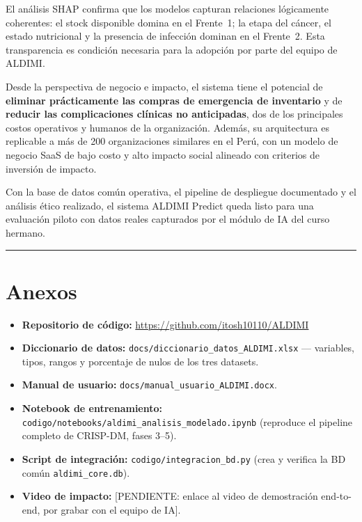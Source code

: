 \documentclass[12pt, a4paper]{article}
\begin{document}
El an\'alisis SHAP confirma que los modelos capturan relaciones l\'ogicamente coherentes: el stock disponible domina en el Frente~1; la etapa del c\'ancer, el estado nutricional y la presencia de infecci\'on dominan en el Frente~2. Esta transparencia es condici\'on necesaria para la adopci\'on por parte del equipo de ALDIMI.

Desde la perspectiva de negocio e impacto, el sistema tiene el potencial de \textbf{eliminar pr\'acticamente las compras de emergencia de inventario} y de \textbf{reducir las complicaciones cl\'inicas no anticipadas}, dos de los principales costos operativos y humanos de la organizaci\'on. Adem\'as, su arquitectura es replica\-ble a m\'as de 200 organizaciones similares en el Per\'u, con un modelo de negocio SaaS de bajo costo y alto impacto social alineado con criterios de inversi\'on de impacto.

Con la base de datos com\'un operativa, el pipeline de despliegue documentado y el an\'alisis \'etico realizado, el sistema ALDIMI Predict queda listo para una evaluaci\'on piloto con datos reales capturados por el m\'odulo de IA del curso hermano.

\vspace{1cm}
\textcolor{secundario}{\rule{\linewidth}{0.8pt}}


\section*{Anexos}

\begin{itemize}[leftmargin=1.6em, itemsep=4pt]
  \item \textbf{Repositorio de c\'odigo:} \url{https://github.com/itosh10110/ALDIMI}
  \item \textbf{Diccionario de datos:} \texttt{docs/diccionario\_datos\_ALDIMI.xlsx} --- variables, tipos, rangos y porcentaje de nulos de los tres datasets.
  \item \textbf{Manual de usuario:} \texttt{docs/manual\_usuario\_ALDIMI.docx}.
  \item \textbf{Notebook de entrenamiento:} \texttt{codigo/notebooks/aldimi\_analisis\_modelado.ipynb} (reproduce el pipeline completo de CRISP-DM, fases 3--5).
  \item \textbf{Script de integraci\'on:} \texttt{codigo/integracion\_bd.py} (crea y verifica la BD com\'un \texttt{aldimi\_core.db}).
  \item \textbf{Video de impacto:} [PENDIENTE: enlace al video de demostraci\'on end-to-end, por grabar con el equipo de IA].
\end{itemize}
\end{document}
